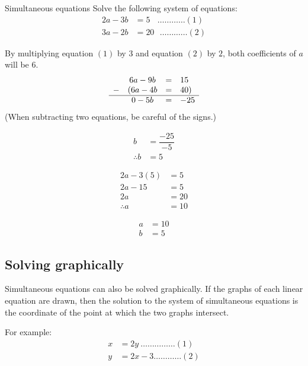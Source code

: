 \begin{wex}
{Simultaneous equations }
{Solve the following system of equations:
\begin{align*}
  2a - 3b &= 5 ~~~~\ldots \ldots \ldots \ldots (1) \\
  3a-2b &= 20 ~~~\ldots \ldots \ldots \ldots (2)
\end{align*}
}
{
By multiplying equation $(1)$ by $3$ and equation $(2)$ by $2$, both coefficients of $a$ will be $6$.
\begin{equation*}
  \begin{array}{cccc}
    \hfill & 6a-9b& =& 15\hfill \\ 
    \hfill- & (6a-4b& =& 40)\hfill \\
    \hline
    \hfill & 0 - 5b &=& -25 
  \end{array}
\end{equation*}
(When subtracting two equations, be careful of the signs.)

\begin{align*}
  b &= \dfrac{-25}{-5} \\
  \therefore b &= 5
\end{align*}

\begin{align*}
  2a - 3(5) &= 5 \\
  2a-15 &= 5 \\
  2a &= 20 \\
  \therefore a &= 10 
\end{align*}


\begin{align*}
  a &= 10 \\
  b &= 5
\end{align*}
}
\end{wex}


\subsection*{Solving graphically}

Simultaneous equations can also be solved graphically. If the graphs of each linear equation are drawn, then the solution to the system of simultaneous equations is the coordinate of the point at which the two graphs intersect.\par 
For example:
\begin{align*}
  x &= 2y  ~\ldots \ldots \ldots \ldots \ldots (1)\\  
  y &= 2x-3  \ldots \ldots \ldots \ldots (2)
\end{align*}

